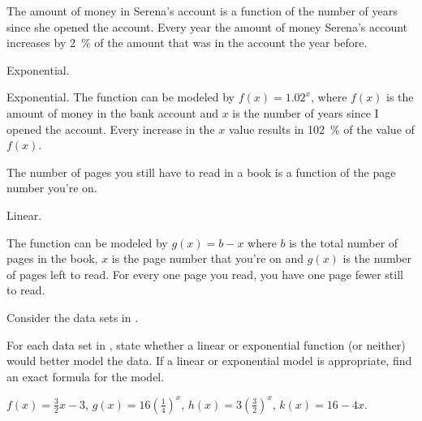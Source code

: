 \begin{exercises}
\begin{problem}
\begin{subproblem}
\end{subproblem}
\begin{subproblem}
	The amount of money in Serena's account is a function of the number 
	of years since she opened the account.
	Every year the amount of money Serena's account increases by \SI{2}{\percent} of the amount that was in the 
	account the year before. 
	\begin{shortsolution}
		Exponential.
	\end{shortsolution}
	\begin{longsolution}
		Exponential. The function can be modeled by $f(x)=1.02^x$, where $f(x)$ is the amount of money 
		in the bank account and $x$ is the number of years since I opened the account. Every increase 
		in the $x$ value results in \SI{102}{\percent} of the value of $f(x)$.
	\end{longsolution}
\end{subproblem}
\begin{subproblem}
	The number of pages you still have to read in a book is a function of the page number you're on.
	\begin{shortsolution}
		Linear.
	\end{shortsolution}
	\begin{longsolution}
		The function can be modeled by $g(x)=b-x$ where $b$ is the total number of pages in the book, 
		$x$ is the page number that you're on and $g(x)$ is the number of pages left to read. For every 
		one page you read, you have one page fewer still to read.
	\end{longsolution}
\end{subproblem}
\end{problem}
			
\begin{problem}
Consider the data sets in .
\begin{subproblem}
	For each data set in , state whether a linear or 
	exponential function (or neither) would better model the data.  If a linear or exponential model is appropriate,  
	find an exact formula for the model.
	\begin{shortsolution}
		$f(x)=\frac{3}{2}x-3$, $g(x)=16\left( \frac{1}{4} \right)^x$, $h(x)=3\left( \frac{3}{2} \right)^x$, $k(x)=16-4x$.
	\end{shortsolution}
\end{subproblem}
			

\end{problem}
\end{exercises}
